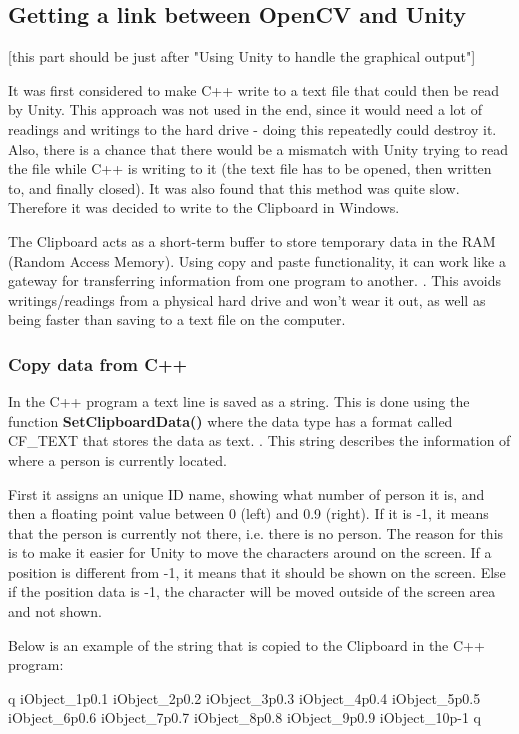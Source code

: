 \subsection{Getting a link between OpenCV and Unity}
[this part should be just after "Using Unity to handle the graphical output"]

It was first considered to make C++ write to a text file that could then be read by Unity. This approach was not used in the end, since it would need a lot of readings and writings to the hard drive - doing this repeatedly could destroy it. Also, there is a chance that there would be a mismatch with Unity trying to read the file while C++ is writing to it (the text file has to be opened, then written to, and finally closed). It was also found that this method was quite slow. Therefore it was decided to write to the Clipboard in Windows.

The Clipboard acts as a short-term buffer to store temporary data in the RAM (Random Access Memory). Using copy and paste functionality, it can work like a gateway for transferring information from one program to another. \citep{clipboard_one}. This avoids writings/readings from a physical hard drive and won't wear it out, as well as being faster than saving to a text file on the computer.

\subsubsection{Copy data from C++}
In the C++ program a text line is saved as a string. This is done using the function \textbf{SetClipboardData()} where the data type has a format called CF\_TEXT that stores the data as text.\citep{clipboard_two} \citep{clipboard_three}. This string describes the information of where a person is currently located.

First it assigns an unique ID name, showing what number of person it is, and then a floating point value between 0 (left) and 0.9 (right). If it is -1, it means that the person is currently not there, i.e. there is no person. The reason for this is to make it easier for Unity to move the characters around on the screen. If a position is different from -1, it means that it should be shown on the screen. Else if the position data is -1, the character will be moved outside of the screen area and not shown.

Below is an example of the string that is copied to the Clipboard in the C++ program:

q iObject\_1p0.1 iObject\_2p0.2 iObject\_3p0.3 iObject\_4p0.4 iObject\_5p0.5 iObject\_6p0.6 iObject\_7p0.7 iObject\_8p0.8 iObject\_9p0.9 iObject\_10p-1 q

